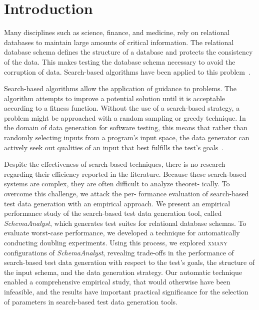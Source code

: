 
\section{Introduction}


Many disciplines such as science, finance, and medicine, rely on relational databases to maintain large amounts of
critical information. The relational database schema defines the structure of a database and protects the consistency of
the data. This makes testing the database schema necessary to avoid the corruption of data. Search-based algorithms have
been applied to this problem~\cite{Kapfhammer2013}.


Search-based algorithms allow the application of guidance to problems. The algorithm attempts to improve a potential
solution until it is acceptable according to a fitness function. Without the use of a search-based strategy, a problem
might be approached with a random sampling or greedy technique. In the domain of data generation for software testing,
this means that rather than randomly selecting inputs from a program’s input space, the data generator can actively seek
out qualities of an input that best fulfills the test’s goals~\cite{McMinn2004a}.

Despite the effectiveness of search-based techniques,
there is no research regarding their efficiency reported
in the literature. Because these search-based systems
are complex, they are often difficult to analyze theoret-
ically. To overcome this challenge, we attack the per-
formance evaluation of search-based test data generation
with an empirical approach. We present an empirical performance
study of the search-based test data generation tool, called
\textit{SchemaAnalyst}, which generates test suites for relational
database schemas. To evaluate worst-case performance,
we developed a technique for automatically conducting
doubling experiments. Using this process, we explored \textsc{xmany} 
configurations of \textit{SchemaAnalyst}, revealing trade-offs
in the performance of search-based test data generation
with respect to the test’s goals, the structure of the
input schema, and the data generation strategy. Our
automatic technique enabled a comprehensive empirical
study, that would otherwise have been infeasible, and the results
have important practical significance for the selection of
parameters in search-based test data generation tools.

